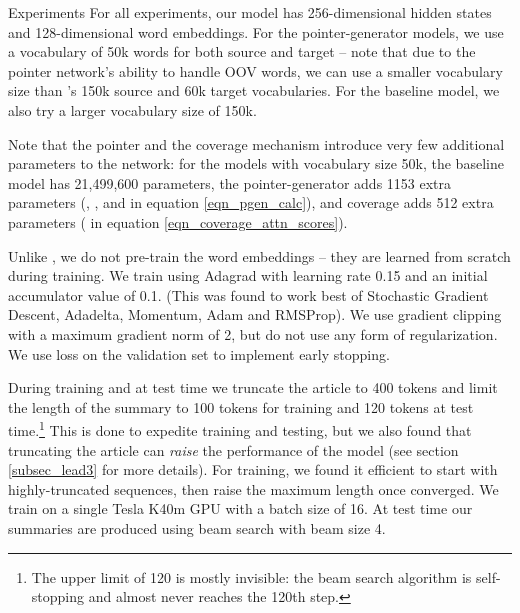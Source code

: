 \documentclass[11pt,a4paper]{article}
\begin{document}
\begin{section}{Experiments}
\label{sec_experiments}
For all experiments, our model has 256-dimensional hidden states and 128-dimensional word embeddings. 
For the pointer-generator models, we use a vocabulary of 50k words for both source and target -- note that due to the pointer network's ability to handle OOV words, we can use a smaller vocabulary size than \citeauthor{nallapati2016abstractive}'s  150k source and 60k target vocabularies.
For the baseline model, we also try a larger vocabulary size of 150k.

Note that the pointer and the coverage mechanism introduce very few additional parameters to the network: for the models with vocabulary size 50k, the baseline model has 21,499,600 parameters, the pointer-generator adds 1153 extra parameters (, ,  and  in equation \ref{eqn_pgen_calc}), and coverage adds 512 extra parameters ( in equation \ref{eqn_coverage_attn_scores}).

Unlike \citet{nallapati2016abstractive}, we do not pre-train the word embeddings -- they are learned from scratch during training.
We train using Adagrad \cite{duchi2011adaptive} with learning rate 0.15 and an initial accumulator value of 0.1.
(This was found to work best of Stochastic Gradient Descent, Adadelta, Momentum, Adam and RMSProp).
We use gradient clipping with a maximum gradient norm of 2, but do not use any form of regularization.
We use loss on the validation set to implement early stopping.

During training and at test time we truncate the article to 400 tokens and limit the length of the summary to 100 tokens for training and 120 tokens at test time.\footnote{The upper limit of 120 is mostly invisible: the beam search algorithm is self-stopping and almost never reaches the 120th step.}
This is done to expedite training and testing, but we also found that truncating the article can \textit{raise} the performance of the model (see section \ref{subsec_lead3} for more details).
For training, we found it efficient to start with highly-truncated sequences, then raise the maximum length once converged.
We train on a single Tesla K40m GPU with a batch size of 16.
At test time our summaries are produced using beam search with beam size 4.


\end{section}
\end{document}
